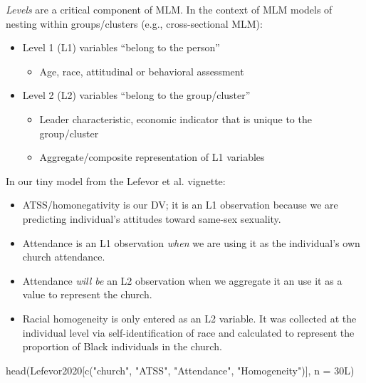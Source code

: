 \documentclass[
  english,
]{book}
\newenvironment{Shaded}{\begin{snugshade}}{\end{snugshade}}
\newcommand{\AttributeTok}[1]{\textcolor[rgb]{0.77,0.63,0.00}{#1}}
\newcommand{\FunctionTok}[1]{\textcolor[rgb]{0.00,0.00,0.00}{#1}}
\newcommand{\NormalTok}[1]{#1}
\newcommand{\StringTok}[1]{\textcolor[rgb]{0.31,0.60,0.02}{#1}}
\providecommand{\tightlist}{%
  \setlength{\itemsep}{0pt}\setlength{\parskip}{0pt}}
\begin{document}
\emph{Levels} are a critical component of MLM. In the context of MLM models of nesting within groups/clusters (e.g., cross-sectional MLM):

\begin{itemize}
\tightlist
\item
  Level 1 (L1) variables ``belong to the person''

  \begin{itemize}
  \tightlist
  \item
    Age, race, attitudinal or behavioral assessment
  \end{itemize}
\item
  Level 2 (L2) variables ``belong to the group/cluster''

  \begin{itemize}
  \tightlist
  \item
    Leader characteristic, economic indicator that is unique to the group/cluster
  \item
    Aggregate/composite representation of L1 variables
  \end{itemize}
\end{itemize}

In our tiny model from the Lefevor et al. \citeyearpar{lefevor_homonegativity_2020} vignette:

\begin{itemize}
\tightlist
\item
  ATSS/homonegativity is our DV; it is an L1 observation because we are predicting individual's attitudes toward same-sex sexuality.
\item
  Attendance is an L1 observation \emph{when} we are using it as the individual's own church attendance.
\item
  Attendance \emph{will be } an L2 observation when we aggregate it an use it as a value to represent the church.
\item
  Racial homogeneity is only entered as an L2 variable. It was collected at the individual level via self-identification of race and calculated to represent the proportion of Black individuals in the church.
\end{itemize}

\begin{Shaded}
\begin{Highlighting}[]
\FunctionTok{head}\NormalTok{(Lefevor2020[}\FunctionTok{c}\NormalTok{(}\StringTok{"church"}\NormalTok{, }\StringTok{"ATSS"}\NormalTok{, }\StringTok{"Attendance"}\NormalTok{, }\StringTok{"Homogeneity"}\NormalTok{)], }\AttributeTok{n =}\NormalTok{ 30L)}
\end{Highlighting}
\end{Shaded}
\end{document}
